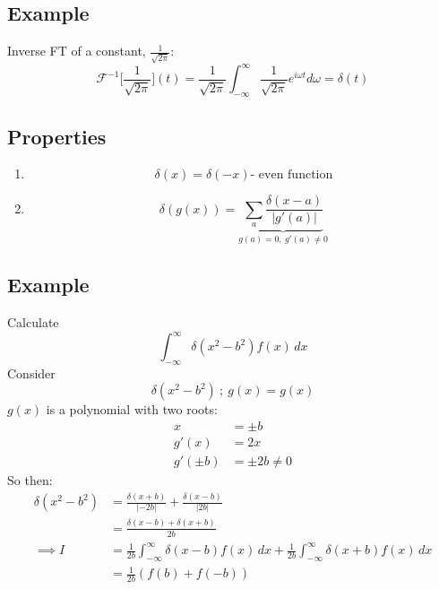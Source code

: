 \documentclass[a4paper, 11pt, normalem]{report}
\newcommand\ifnt{\int_{-\infty}^{\infty}}
\newcommand\F{\mathcal{F}}
\newcommand\om{\omega}
\begin{document}
\subsection{Example}
Inverse FT of a constant, $\frac{1}{\sqrt{2\pi}}$:
\begin{equation*}
    \F^{-1}\Big[\frac{1}{\sqrt{2\pi}}\Big](t) = \frac{1}{\sqrt{2\pi}} \ifnt \frac{1}{\sqrt{2\pi}} e^{i\om t}d\om = \delta(t)
\end{equation*}

\subsection{Properties}
\begin{enumerate}
    \item   \begin{equation*}
                \delta(x) = \delta(-x) \text{- even function}
            \end{equation*}
    \item   \begin{equation*}
                \delta(g(x)) = \underbrace{\sum_{a} \frac{\delta(x - a)}{|g'(a)|}}_{g(a) = 0,~g'(a) \neq 0}
            \end{equation*}
\end{enumerate}


\subsection{Example}
Calculate
\begin{equation*}
    \ifnt \delta(x^2 - b^2)f(x)\,dx
\end{equation*}
Consider
\begin{equation*}
    \delta(x^2 - b^2) ~;~ g(x) = g(x)
\end{equation*}
$g(x)$ is a polynomial with two roots:
\begin{align*}
    x &= \pm b \\
    g'(x) &= 2x \\
    g'(\pm b) &= \pm 2b \neq 0
\end{align*}
So then:
\begin{align*}
    \delta(x^2 - b^2) &= \frac{\delta(x + b)}{|-2b|} + \frac{\delta(x - b)}{|2b|} \\
    &= \frac{\delta(x - b) + \delta(x + b)}{2b} \\
    \implies I &= \frac{1}{2b} \ifnt \delta(x - b)f(x)\,dx + \frac{1}{2b}\ifnt \delta(x + b)f(x)\,dx \\
    &= \frac{1}{2b}(f(b) + f(-b))
\end{align*}
\end{document}
